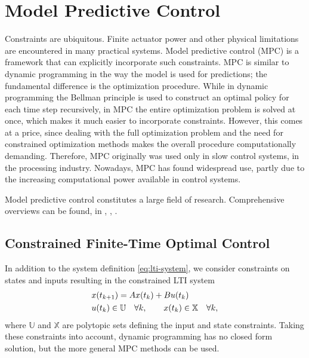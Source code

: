 \section{Model Predictive Control}
\label{sec:model-predictive-control}

Constraints are ubiquitous. Finite actuator power and other physical
limitations are encountered in many practical systems. Model predictive control
(MPC) is a framework that can explicitly incorporate such constraints. MPC is
similar to dynamic programming in the way the model is used for predictions;
the fundamental difference is the optimization procedure. While in dynamic
programming the Bellman principle is used to construct an optimal policy for
each time step recursively, in MPC the entire optimization problem is solved at
once, which makes it much easier to incorporate constraints. However, this
comes at a price, since dealing with the full optimization problem and the need
for constrained optimization methods makes the overall procedure computationally
demanding.
Therefore, MPC originally was used only in slow control systems,
%
%
%
\eg in the processing industry. Nowadays, MPC has found widespread use, partly
due to the increasing computational power available in control systems.

Model predictive control constitutes a large field of research. Comprehensive
overviews can be found, \eg in ,
, .

\subsection{Constrained Finite-Time Optimal Control}

In addition to the system definition \eqref{eq:lti-system}, we consider
constraints on states and inputs resulting in the constrained LTI system
\begin{subequations}
\begin{align}
  &x(t_{k+1}) = Ax(t_k) + Bu(t_k)\\
  &u(t_k) \in \mathbb{U}\quad\forall k, \qquad x(t_k) \in \mathbb{X} \quad\forall k,
\end{align}
\end{subequations}
where $\mathbb{U}$ and $\mathbb{X}$ are polytopic sets defining the input and
state constraints. Taking these constraints into account, dynamic programming
has no closed form solution, but the more general MPC methods can be used.

